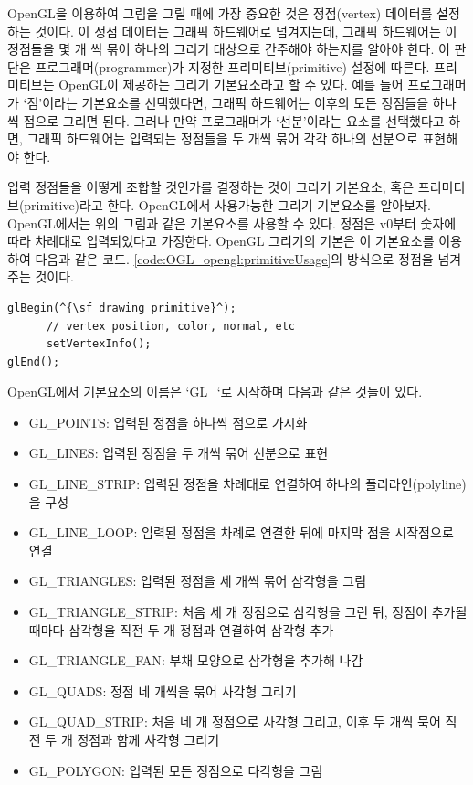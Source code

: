 OpenGL을 이용하여 그림을 그릴 때에 가장 중요한 것은 정점(vertex) 데이터를 설정하는 것이다. 이 정점 데이터는 그래픽 하드웨어로 넘겨지는데, 그래픽 하드웨어는 이 정점들을 몇 개 씩 묶어 하나의 그리기 대상으로 간주해야 하는지를 알아야 한다. 이 판단은 프로그래머(programmer)가 지정한 프리미티브(primitive) 설정에 따른다. 
프리미티브는 OpenGL이 제공하는 그리기 기본요소라고 할 수 있다.
예를 들어 프로그래머가 ‘점’이라는 기본요소를 선택했다면, 
그래픽 하드웨어는 이후의 모든 정점들을 하나씩 점으로 그리면 된다. 
그러나 만약 프로그래머가 ‘선분’이라는 요소를 선택했다고 하면, 그래픽 하드웨어는 입력되는 정점들을 두 개씩 묶어 각각 하나의 선분으로 표현해야 한다. 

입력 정점들을 어떻게 조합할 것인가를 결정하는 것이 그리기 기본요소, 혹은 프리미티브(primitive)라고 한다. OpenGL에서 사용가능한 그리기 기본요소를 알아보자.
OpenGL에서는 위의 그림과 같은 기본요소를 사용할 수 있다. 정점은 v0부터 숫자에 따라 차례대로 입력되었다고 가정한다. OpenGL 그리기의 기본은 이 기본요소를 이용하여 다음과 같은 코드. \ref{code:OGL_opengl:primitiveUsage}의 방식으로 정점을 넘겨주는 것이다.

\begin{algorithmbis}\label{code:OGL_opengl:primitiveUsage}
\lstset{language=C++, escapechar=^} 
\begin{lstlisting}
glBegin(^{\sf drawing primitive}^);
      // vertex position, color, normal, etc
      setVertexInfo(); 
glEnd(); 
\end{lstlisting}
\end{algorithmbis}

OpenGL에서 기본요소의 이름은 ‘GL\_‘로 시작하며 다음과 같은 것들이 있다.

\begin{itemize}
\item {\sf GL\_POINTS}: 입력된 정점을 하나씩 점으로 가시화
\item {\sf GL\_LINES}: 입력된 정점을 두 개씩 묶어 선분으로 표현 
\item {\sf GL\_LINE\_STRIP}: 입력된 정점을 차례대로 연결하여 하나의 폴리라인(polyline)을 구성
\item {\sf GL\_LINE\_LOOP}: 입력된 정점을 차례로 연결한 뒤에 마지막 점을 시작점으로 연결
\item {\sf GL\_TRIANGLES}: 입력된 정점을 세 개씩 묶어 삼각형을 그림
\item {\sf GL\_TRIANGLE\_STRIP}: 처음 세 개 정점으로 삼각형을 그린 뒤, 정점이 추가될 때마다 삼각형을 직전 두 개 정점과 연결하여 삼각형 추가 
\item {\sf GL\_TRIANGLE\_FAN}: 부채 모양으로 삼각형을 추가해 나감
\item {\sf GL\_QUADS}: 정점 네 개씩을 묶어 사각형 그리기
\item {\sf GL\_QUAD\_STRIP}: 처음 네 개 정점으로 사각형 그리고, 이후 두 개씩 묵어 직전 두 개 정점과 함께 사각형 그리기
\item {\sf GL\_POLYGON}: 입력된 모든 정점으로 다각형을 그림
\end{itemize}

